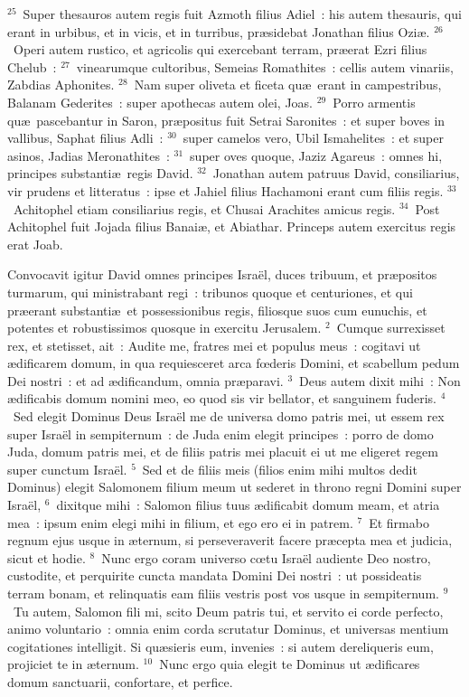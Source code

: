 ${}^{25}$~Super thesauros autem regis fuit Azmoth filius Adiel~: his autem thesauris, qui erant in urbibus, et in vicis, et in turribus, pr\ae sidebat Jonathan filius Ozi\ae .
${}^{26}$~Operi autem rustico, et agricolis qui exercebant terram, pr\ae erat Ezri filius Chelub~:
${}^{27}$~vinearumque cultoribus, Semeias Romathites~: cellis autem vinariis, Zabdias Aphonites.
${}^{28}$~Nam super oliveta et ficeta qu\ae\ erant in campestribus, Balanam Gederites~: super apothecas autem olei, Joas.
${}^{29}$~Porro armentis qu\ae\ pascebantur in Saron, pr\ae positus fuit Setrai Saronites~: et super boves in vallibus, Saphat filius Adli~:
${}^{30}$~super camelos vero, Ubil Ismahelites~: et super asinos, Jadias Meronathites~:
${}^{31}$~super oves quoque, Jaziz Agareus~: omnes hi, principes substanti\ae\ regis David.
${}^{32}$~Jonathan autem patruus David, consiliarius, vir prudens et litteratus~: ipse et Jahiel filius Hachamoni erant cum filiis regis.
${}^{33}$~Achitophel etiam consiliarius regis, et Chusai Arachites amicus regis.
${}^{34}$~Post Achitophel fuit Jojada filius Banai\ae , et Abiathar. Princeps autem exercitus regis erat Joab.

\lettrine[lines=3,image=true,loversize=0.05,lraise=-0.03]{C}{}onvocavit igitur David omnes principes Isra\"el, duces tribuum, et pr\ae positos turmarum, qui ministrabant regi~: tribunos quoque et centuriones, et qui pr\ae erant substanti\ae\ et possessionibus regis, filiosque suos cum eunuchis, et potentes et robustissimos quosque in exercitu Jerusalem.
${}^{2}$~Cumque surrexisset rex, et stetisset, ait~: Audite me, fratres mei et populus meus~: cogitavi ut \ae dificarem domum, in qua requiesceret arca fœderis Domini, et scabellum pedum Dei nostri~: et ad \ae dificandum, omnia pr\ae paravi.
${}^{3}$~Deus autem dixit mihi~: Non \ae dificabis domum nomini meo, eo quod sis vir bellator, et sanguinem fuderis.
${}^{4}$~Sed elegit Dominus Deus Isra\"el me de universa domo patris mei, ut essem rex super Isra\"el in sempiternum~: de Juda enim elegit principes~: porro de domo Juda, domum patris mei, et de filiis patris mei placuit ei ut me eligeret regem super cunctum Isra\"el.
${}^{5}$~Sed et de filiis meis (filios enim mihi multos dedit Dominus) elegit Salomonem filium meum ut sederet in throno regni Domini super Isra\"el,
${}^{6}$~dixitque mihi~: Salomon filius tuus \ae dificabit domum meam, et atria mea~: ipsum enim elegi mihi in filium, et ego ero ei in patrem.
${}^{7}$~Et firmabo regnum ejus usque in \ae ternum, si perseveraverit facere pr\ae cepta mea et judicia, sicut et hodie.
${}^{8}$~Nunc ergo coram universo cœtu Isra\"el audiente Deo nostro, custodite, et perquirite cuncta mandata Domini Dei nostri~: ut possideatis terram bonam, et relinquatis eam filiis vestris post vos usque in sempiternum.
${}^{9}$~Tu autem, Salomon fili mi, scito Deum patris tui, et servito ei corde perfecto, animo voluntario~: omnia enim corda scrutatur Dominus, et universas mentium cogitationes intelligit. Si qu\ae sieris eum, invenies~: si autem dereliqueris eum, projiciet te in \ae ternum.
${}^{10}$~Nunc ergo quia elegit te Dominus ut \ae dificares domum sanctuarii, confortare, et perfice.


